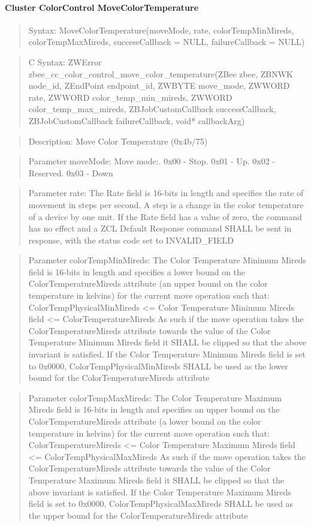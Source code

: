 \paragraph{Cluster ColorControl MoveColorTemperature}
\begin{quote}Syntax: MoveColorTemperature(moveMode, rate, colorTempMinMireds, colorTempMaxMireds, successCallback = NULL, failureCallback = NULL)\end{quote}
\begin{quote}C Syntax: ZWError zbee\_cc\_color\_control\_move\_color\_temperature(ZBee zbee, ZBNWK node\_id, ZEndPoint endpoint\_id, ZWBYTE move\_mode, ZWWORD rate, ZWWORD color\_temp\_min\_mireds, ZWWORD color\_temp\_max\_mireds, ZBJobCustomCallback successCallback, ZBJobCustomCallback failureCallback, void* callbackArg)\end{quote}
\begin{quote}Description: Move Color Temperature (0x4b/75)\end{quote}
\begin{quote}Parameter moveMode: Move mode:. 0x00 - Stop. 0x01 - Up. 0x02 - Reserved. 0x03 - Down\end{quote}
\begin{quote}Parameter rate: The Rate field is 16-bits in length and specifies the rate of movement in steps per second. A step is a change in the color temperature of a device by one unit. If the Rate field has a value of zero, the command has no effect and a ZCL Default Response command SHALL be sent in response, with the status code set to INVALID\_FIELD\end{quote}
\begin{quote}Parameter colorTempMinMireds: The Color Temperature Minimum Mireds field is 16-bits in length and specifies a lower bound on the ColorTemperatureMireds attribute (an upper bound on the color temperature in kelvins) for the current move operation such that: ColorTempPhysicalMinMireds <= Color Temperature Minimum Mireds field <= ColorTemperatureMireds As such if the move operation takes the ColorTemperatureMireds attribute towards the value of the Color Temperature Minimum Mireds field it SHALL be clipped so that the above invariant is satisfied. If the Color Temperature Minimum Mireds field is set to 0x0000, ColorTempPhysicalMinMireds SHALL be used as the lower bound for the ColorTemperatureMireds attribute\end{quote}
\begin{quote}Parameter colorTempMaxMireds: The Color Temperature Maximum Mireds field is 16-bits in length and specifies an upper bound on the ColorTemperatureMireds attribute (a lower bound on the color temperature in kelvins) for the current move operation such that: ColorTemperatureMireds <= Color Temperature Maximum Mireds field <= ColorTempPhysicalMaxMireds As such if the move operation takes the ColorTemperatureMireds attribute towards the value of the Color Temperature Maximum Mireds field it SHALL be clipped so that the above invariant is satisfied. If the Color Temperature Maximum Mireds field is set to 0x0000, ColorTempPhysicalMaxMireds SHALL be used as the upper bound for the ColorTemperatureMireds attribute\end{quote}
